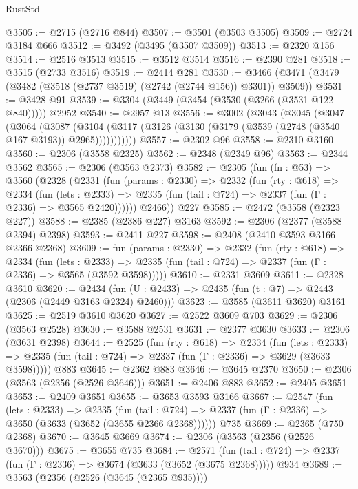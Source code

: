 \begin{lexlean}{RustStd}
\begin{coremodule}
@3505 := @2715 (@2716 @844)
@3507 := @3501 (@3503 @3505)
@3509 := @2724 @3184 @666
@3512 := @3492 (@3495 (@3507 @3509))
@3513 := @2320 @156
@3514 := @2516 @3513
@3515 := @3512 @3514
@3516 := @2390 @281
@3518 := @3515 (@2733 @3516)
@3519 := @2414 @281
@3530 := @3466 (@3471 (@3479 (@3482 (@3518 (@2737 @3519) (@2742 (@2744 @156)) @3301)) @3509))
@3531 := @3428 @91
@3539 := @3304 (@3449 (@3454 (@3530 (@3266 (@3531 @122 @840))))) @2952
@3540 := @2957 @13
@3556 := @3002
    (@3043
      (@3045
        (@3047
          (@3064
            (@3087
              (@3104 (@3117 (@3126 (@3130 (@3179 (@3539 (@2748 (@3540 @167 @3193)) @2965)))))))))))
@3557 := @2302 @96
@3558 := @2310 @3160
@3560 := @2306 (@3558 @2325)
@3562 := @2348 (@2349 @96)
@3563 := @2344 @3562
@3565 := @2306 (@3563 @2373)
@3582 := @2305
    (fun (fn : @53) =>
    @3560
      (@2328
        (@2331
          (fun (params : @2330) =>
          @2332
            (fun (rty : @618) =>
            @2334
              (fun (lets : @2333) =>
              @2335 (fun (tail : @724) => @2337 (fun (Γ : @2336) => @3565 @2420))))))
        @2466))
    @227
@3585 := @2472 (@3558 (@2323 @227))
@3588 := @2385 (@2386 @227) @3163
@3592 := @2306 (@2377 (@3588 @2394) @2398)
@3593 := @2411 @227
@3598 := @2408 (@2410 @3593 @3166 @2366 @2368)
@3609 := fun (params : @2330) =>
  @2332
    (fun (rty : @618) =>
    @2334
      (fun (lets : @2333) =>
      @2335 (fun (tail : @724) => @2337 (fun (Γ : @2336) => @3565 (@3592 @3598)))))
@3610 := @2331 @3609
@3611 := @2328 @3610
@3620 := @2434 (fun (U : @2433) => @2435 (fun (t : @7) => @2443 (@2306 (@2449 @3163 @2324) @2460)))
@3623 := @3585 (@3611 @3620) @3161
@3625 := @2519 @3610 @3620
@3627 := @2522 @3609 @703
@3629 := @2306 (@3563 @2528)
@3630 := @3588 @2531
@3631 := @2377 @3630
@3633 := @2306 (@3631 @2398)
@3644 := @2525
    (fun (rty : @618) =>
    @2334
      (fun (lets : @2333) =>
      @2335 (fun (tail : @724) => @2337 (fun (Γ : @2336) => @3629 (@3633 @3598)))))
    @883
@3645 := @2362 @883
@3646 := @3645 @2370
@3650 := @2306 (@3563 (@2356 (@2526 @3646)))
@3651 := @2406 @883
@3652 := @2405 @3651
@3653 := @2409 @3651
@3655 := @3653 @3593 @3166
@3667 := @2547
    (fun (lets : @2333) =>
    @2335
      (fun (tail : @724) => @2337 (fun (Γ : @2336) => @3650 (@3633 (@3652 (@3655 @2366 @2368))))))
    @735
@3669 := @2365 (@750 @2368)
@3670 := @3645 @3669
@3674 := @2306 (@3563 (@2356 (@2526 @3670)))
@3675 := @3655 @735
@3684 := @2571
    (fun (tail : @724) => @2337 (fun (Γ : @2336) => @3674 (@3633 (@3652 (@3675 @2368)))))
    @934
@3689 := @3563 (@2356 (@2526 (@3645 (@2365 @935))))

\end{coremodule}
\end{lexlean}
